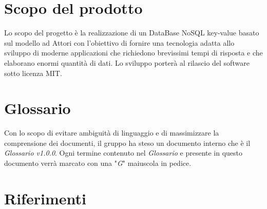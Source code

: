 \documentclass[a4paper]{report}
\begin{document}
	\section{Scopo del prodotto}
	Lo scopo del progetto è la realizzazione di un DataBase NoSQL key-value basato sul modello ad Attori con l'obiettivo di fornire una 
	tecnologia adatta allo sviluppo di moderne applicazioni che richiedono brevissimi tempi di risposta e che elaborano enormi quantità 
	di dati. Lo sviluppo porterà al rilascio del software sotto licenza MIT.
	\section{Glossario}
	Con lo scopo di evitare ambiguità di linguaggio e di massimizzare la comprensione dei documenti, il gruppo ha steso un documento 
	interno che è il \emph{Glossario v1.0.0}. Ogni termine contenuto nel \emph{Glossario} e presente in questo documento verrà marcato 
	con una "\textit{G}" maiuscola in pedice.
	\section{Riferimenti}
\end{document}

